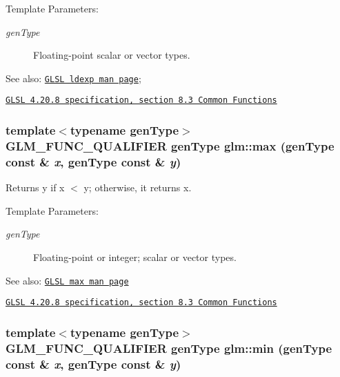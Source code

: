\begin{Desc}
\item[Template Parameters:]
\begin{description}
\item[{\em genType}]Floating-point scalar or vector types.\end{description}
\end{Desc}
\begin{Desc}
\item[See also:]\href{http://www.opengl.org/sdk/docs/manglsl/xhtml/ldexp.xml}{\tt GLSL ldexp man page}; 

\href{http://www.opengl.org/registry/doc/GLSLangSpec.4.20.8.pdf}{\tt GLSL 4.20.8 specification, section 8.3 Common Functions} \end{Desc}
\hypertarget{group__core__func__common_g4e4d7b280fec55e5dfeb1367a1a2597d}{
\subsubsection[max]{\setlength{\rightskip}{0pt plus 5cm}template$<$typename genType$>$ GLM\_\-FUNC\_\-QUALIFIER genType glm::max (genType const \& {\em x}, \/  genType const \& {\em y})}}
\label{group__core__func__common_g4e4d7b280fec55e5dfeb1367a1a2597d}


Returns y if x $<$ y; otherwise, it returns x.

\begin{Desc}
\item[Template Parameters:]
\begin{description}
\item[{\em genType}]Floating-point or integer; scalar or vector types.\end{description}
\end{Desc}
\begin{Desc}
\item[See also:]\href{http://www.opengl.org/sdk/docs/manglsl/xhtml/max.xml}{\tt GLSL max man page} 

\href{http://www.opengl.org/registry/doc/GLSLangSpec.4.20.8.pdf}{\tt GLSL 4.20.8 specification, section 8.3 Common Functions} \end{Desc}
\hypertarget{group__core__func__common_g7c4425eacc9498bb2ab8a7cfd662cd69}{
\subsubsection[min]{\setlength{\rightskip}{0pt plus 5cm}template$<$typename genType$>$ GLM\_\-FUNC\_\-QUALIFIER genType glm::min (genType const \& {\em x}, \/  genType const \& {\em y})}}
\label{group__core__func__common_g7c4425eacc9498bb2ab8a7cfd662cd69}


